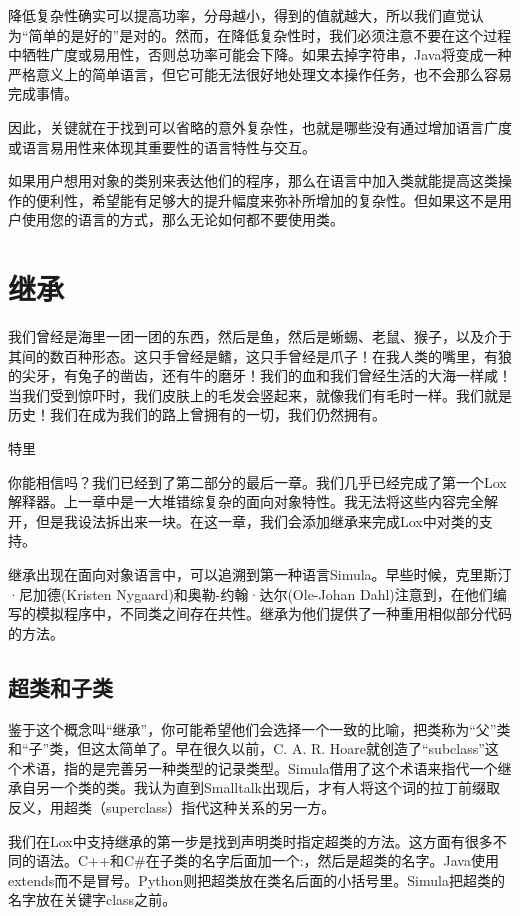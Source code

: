\documentclass[cn,11pt,chinese]{elegantbook}
\begin{document}
降低复杂性确实可以提高功率，分母越小，得到的值就越大，所以我们直觉认为“简单的是好的”是对的。然而，在降低复杂性时，我们必须注意不要在这个过程中牺牲广度或易用性，否则总功率可能会下降。如果去掉字符串，Java将变成一种严格意义上的简单语言，但它可能无法很好地处理文本操作任务，也不会那么容易完成事情。

因此，关键就在于找到可以省略的意外复杂性，也就是哪些没有通过增加语言广度或语言易用性来体现其重要性的语言特性与交互。

如果用户想用对象的类别来表达他们的程序，那么在语言中加入类就能提高这类操作的便利性，希望能有足够大的提升幅度来弥补所增加的复杂性。但如果这不是用户使用您的语言的方式，那么无论如何都不要使用类。

\chapter{继承}

\epigraph{我们曾经是海里一团一团的东西，然后是鱼，然后是蜥蜴、老鼠、猴子，以及介于其间的数百种形态。这只手曾经是鳍，这只手曾经是爪子！在我人类的嘴里，有狼的尖牙，有兔子的凿齿，还有牛的磨牙！我们的血和我们曾经生活的大海一样咸！当我们受到惊吓时，我们皮肤上的毛发会竖起来，就像我们有毛时一样。我们就是历史！我们在成为我们的路上曾拥有的一切，我们仍然拥有。}{特里}

你能相信吗？我们已经到了第二部分的最后一章。我们几乎已经完成了第一个Lox解释器。上一章中是一大堆错综复杂的面向对象特性。我无法将这些内容完全解开，但是我设法拆出来一块。在这一章，我们会添加继承来完成Lox中对类的支持。

继承出现在面向对象语言中，可以追溯到第一种语言Simula。早些时候，克里斯汀·尼加德(Kristen Nygaard)和奥勒-约翰·达尔(Ole-Johan Dahl)注意到，在他们编写的模拟程序中，不同类之间存在共性。继承为他们提供了一种重用相似部分代码的方法。

\section{超类和子类}

鉴于这个概念叫“继承”，你可能希望他们会选择一个一致的比喻，把类称为“父”类和“子”类，但这太简单了。早在很久以前，C. A. R. Hoare就创造了“subclass”这个术语，指的是完善另一种类型的记录类型。Simula借用了这个术语来指代一个继承自另一个类的类。我认为直到Smalltalk出现后，才有人将这个词的拉丁前缀取反义，用超类（superclass）指代这种关系的另一方。

我们在Lox中支持继承的第一步是找到声明类时指定超类的方法。这方面有很多不同的语法。C++和C\#在子类的名字后面加一个:，然后是超类的名字。Java使用extends而不是冒号。Python则把超类放在类名后面的小括号里。Simula把超类的名字放在关键字class之前。
\end{document}
